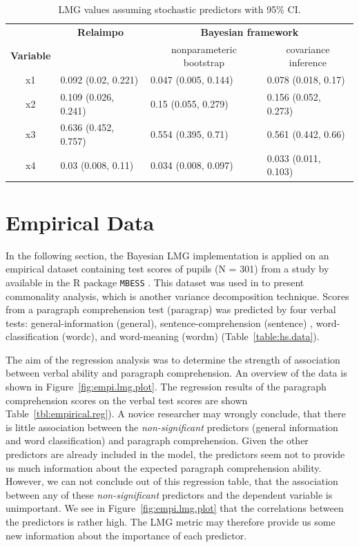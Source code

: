 \documentclass[11pt,a4paper,twoside]{book}
\begin{document}
\begin{table}[h]
\caption{LMG values assuming stochastic predictors with 95\% CI.}
\centering
\begin{tabular}{clll}
   \toprule
  & \multicolumn{1}{c}{\textbf{Relaimpo}} & \multicolumn{2}{c}{\textbf{Bayesian framework}} \\ \cmidrule(r){2-2}\cmidrule(l){3-4}
 \textbf{Variable} &  & \multicolumn{1}{c}{nonparameteric bootstrap}& \multicolumn{1}{c}{covariance inference} \\
 \midrule
x1 & 0.092 (0.02, 0.221)  & 0.047 (0.005, 0.144) &  0.078 (0.018, 0.17) \\ 
x2 & 0.109 (0.026, 0.241)  & 0.15 (0.055, 0.279)  & 0.156 (0.052, 0.273) \\ 
x3 & 0.636 (0.452, 0.757)  & 0.554 (0.395, 0.71)  & 0.561 (0.442, 0.66) \\ 
x4 & 0.03 (0.008, 0.11) & 0.034 (0.008, 0.097) & 0.033 (0.011, 0.103) \\ 
   \bottomrule
\end{tabular}
\label{tbl:nonstochEx1relaimpstoch}
\end{table}







\clearpage

\section{Empirical Data}
In the following section, the Bayesian LMG implementation is applied on an empirical dataset containing test scores of pupils (N = 301) from a study by \cite{Holzinger1939} available in the R package \texttt{MBESS} \citep{MBESS}. This dataset was used in \cite{Nimon2008} to present commonality analysis, which is another variance decomposition technique. Scores from a paragraph comprehension test (paragrap) was predicted by four verbal tests:  general-information (general),  sentence-comprehension (sentence) ,  word-classification (wordc), and  word-meaning (wordm) (Table~\ref{table:hs.data}). 

The aim of the regression analysis  was to determine the strength of association between verbal ability and paragraph comprehension.  
An overview of the data is shown in Figure~\ref{fig:empi.lmg.plot}. The regression results of the paragraph comprehension scores on the verbal test scores are shown Table~\ref{tbl:empirical.reg}). A novice researcher may wrongly conclude, that there is little association between the \textit{non-significant} predictors (general information and word classification) and paragraph comprehension. Given the other predictors are already included in the model, the predictors seem not to provide us much information about the expected paragraph comprehension ability. However, we can not conclude out of this regression table, that the association between any of these \textit{non-significant} predictors and the dependent variable is unimportant. We see in Figure~\ref{fig:empi.lmg.plot} that the correlations between the predictors is rather high. The LMG metric may therefore provide us some new information about the importance of each predictor. 
\end{document}
